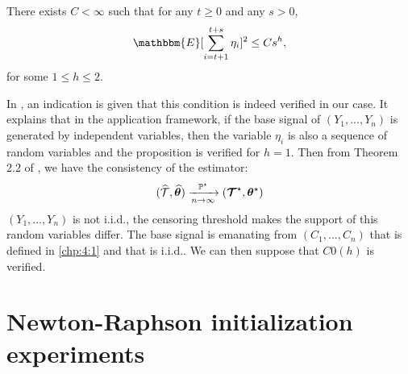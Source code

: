 \begin{appendices}
\begin{proposition}
     There exists $C < \infty$ such that for any $t\geq 0$ and any $s > 0$,
     \begin{equation}\label{app:C0}
     \mathbbm{E}[\sum_{i=t+1}^{t+s}\eta_i]^2\leq Cs^h,    
     \end{equation}
     for some $1\leq h\leq 2$.
\end{proposition}

In \citep{Lavielle1997}, an indication is given that this condition is indeed verified in our case. It explains that in the application framework, if the base signal of $(Y_1,...,Y_n)$ is generated by independent variables, then the variable $\eta_i$ is also a sequence of random variables and the proposition is verified for $h = 1$. Then from Theorem 2.2 of \cite{Lavielle1997}, we have the consistency of the estimator: 
$$ (\widehat{{\mathcal T}}, \widehat{\bm \theta}) \xrightarrow[n\rightarrow \infty]{{\mathbb P}^{\star}}   (\bm{{\mathcal T}}^{\star}, \bm \theta^{\star})$$
$(Y_1,...,Y_n)$ is not i.i.d., the censoring threshold makes the support of this random variables differ. The base signal is emanating from $(C_1,...,C_n)$ that is defined in \ref{chp:4:1} and that is i.i.d.. We can then suppose that $C0(h)$ is verified.  

\section{Newton-Raphson initialization experiments}\label{app:chap4:2}


\end{appendices}
